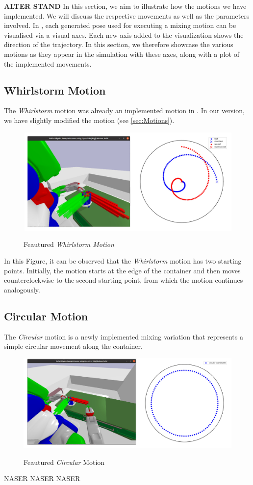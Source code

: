 \textbf{ALTER STAND}
In this section, we aim to illustrate how the motions we have implemented.
We will discuss the respective movements as well as the parameters involved. In  \cite{pycram}, each generated pose used for executing 
a mixing motion can be visualised via a visual axes. Each new axis added to the visualization shows the direction of the trajectory. 
In this section, we therefore showcase the various motions as they appear in the simulation with these axes, along with a plot of the implemented movements.


\subsection*{Whirlstorm Motion}
The \textit{Whirlstorm} motion was already an implemented motion in  \cite{pycram}. In our version, we have slightly modified the motion (see \ref{sec:Motions}).

\begin{figure}[H]
    \includegraphics[scale=0.3]{Graphics/whirlstorm_showcase.jpg}
    \label{fig:whirlstormshowcase}
    \caption{Feautured \textit{Whirlstorm Motion}}
\end{figure}

In this Figure, it can be observed that the \textit{Whirlstorm} motion has two starting points. Initially, the motion starts at the edge of the container and then moves counterclockwise to the second starting point, from which the motion continues analogously.

\subsection*{Circular Motion}
The \textit{Circular} motion is a newly implemented mixing variation that represents a simple circular movement along the container.
\begin{figure}[H]
    \includegraphics[scale=0.3]{Graphics/circular_showcase.jpg}
    \label{fig:circularshowcase}
    \caption{Feautured \textit{Circular} Motion}
\end{figure}
NASER NASER NASER
